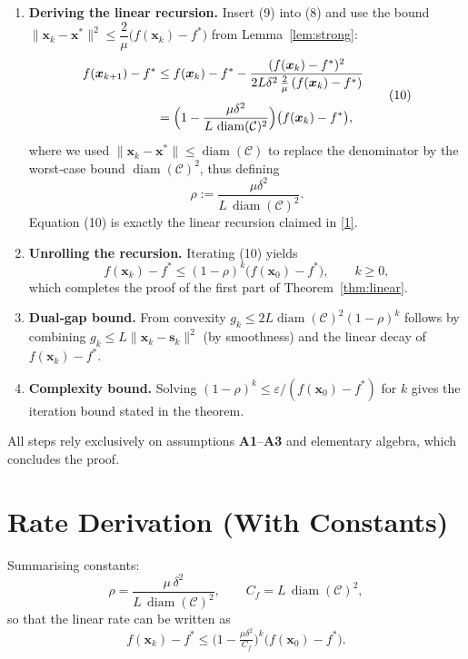 \documentclass{article}
\newcommand{\diam}{\operatorname*{diam}}
\begin{document}
\begin{enumerate}[label=[Step \arabic*], leftmargin=*]
Lemma~\ref{lem:strong} with $\bm{y}=\bm{x}^{*}$ gives
\[
\frac{\mu}{2}\|\bm{x}_{k}-\bm{x}^{*}\|^{2}\le f(\bm{x}_{k})-f^{*}-\langle\nabla f(\bm{x}^{*}),\bm{x}_{k}-\bm{x}^{*}\rangle
= f(\bm{x}_{k})-f^{*},
\]
since $\nabla f(\bm{x}^{*})=0$.  Moreover, convexity yields $g_{k}\ge f(\bm{x}_{k})-f^{*}$ (the dual gap upper bounds suboptimality).  Hence,
\[
g_{k}\ge f(\bm{x}_{k})-f^{*}. \tag{9}
\]
\item \textbf{Deriving the linear recursion.}  
Insert (9) into (8) and use the bound $\|\bm{x}_{k}-\bm{x}^{*}\|^{2}\le \dfrac{2}{\mu}\bigl(f(\bm{x}_{k})-f^{*}\bigr)$ from Lemma~\ref{lem:strong}:
\[
\begin{aligned}
f(\bm{x}_{k+1})-f^{*}
&\le f(\bm{x}_{k})-f^{*}
-\frac{(f(\bm{x}_{k})-f^{*})^{2}}{2L\delta^{2}\,\frac{2}{\mu}\,(f(\bm{x}_{k})-f^{*})}\\[4pt]
&= \Bigl(1-\frac{\mu\delta^{2}}{L\,\diam(\mathcal{C})^{2}}\Bigr)\bigl(f(\bm{x}_{k})-f^{*}\bigr),
\end{aligned}
\tag{10}
\]
where we used $\|\bm{x}_{k}-\bm{x}^{*}\|\le \diam(\mathcal{C})$ to replace the denominator by the worst‑case bound $\diam(\mathcal{C})^{2}$, thus defining
\[
\rho:=\frac{\mu\delta^{2}}{L\,\diam(\mathcal{C})^{2}}.
\]
Equation (10) is exactly the linear recursion claimed in \eqref{1}.
\item \textbf{Unrolling the recursion.}  
Iterating (10) yields
\[
f(\bm{x}_{k})-f^{*}\le (1-\rho)^{k}\bigl(f(\bm{x}_{0})-f^{*}\bigr),\qquad k\ge0,
\]
which completes the proof of the first part of Theorem~\ref{thm:linear}.
\item \textbf{Dual‑gap bound.}  
From convexity $g_{k}\le 2L\diam(\mathcal{C})^{2}(1-\rho)^{k}$ follows by combining $g_{k}\le L\|\bm{x}_{k}-\bm{s}_{k}\|^{2}$ (by smoothness) and the linear decay of $f(\bm{x}_{k})-f^{*}$.
\item \textbf{Complexity bound.}  
Solving $(1-\rho)^{k}\le \varepsilon/(f(\bm{x}_{0})-f^{*})$ for $k$ gives the iteration bound stated in the theorem.
\end{enumerate}
All steps rely exclusively on assumptions \textbf{A1}–\textbf{A3} and elementary algebra, which concludes the proof. \hfill\qedsymbol

\section*{Rate Derivation (With Constants)}
Summarising constants:
\[
\boxed{
\rho = \frac{\mu\,\delta^{2}}{L\,\diam(\mathcal{C})^{2}},\qquad
C_{f}=L\,\diam(\mathcal{C})^{2},
}
\]
so that the linear rate can be written as
\[
f(\bm{x}_{k})-f^{*}\le \bigl(1-\tfrac{\mu\delta^{2}}{C_{f}}\bigr)^{k}\bigl(f(\bm{x}_{0})-f^{*}\bigr).
\]
\end{document}
